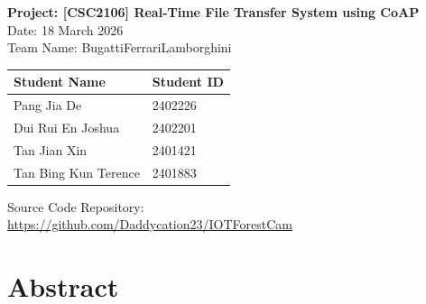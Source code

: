 \documentclass[12pt,a4paper]{article}
\begin{document}

\begin{center}
    \vspace*{1cm}
    {\Large \textbf{Project: [CSC2106] Real-Time File Transfer System using CoAP}} \\[0.5cm]
    {\large Date: 18 March 2026} \\[0.3cm]
    {\large Team Name: BugattiFerrariLamborghini} \\[1cm]

    \begin{tabular}{|p{7cm}|p{4cm}|}
        \hline
        \textbf{Student Name} & \textbf{Student ID} \\
        \hline
        Pang Jia De & 2402226 \\
        \hline
        Dui Rui En Joshua & 2402201 \\
        \hline
        Tan Jian Xin & 2401421 \\
        \hline
        Tan Bing Kun Terence & 2401883 \\
        \hline
    \end{tabular}

    \vspace{1cm}
    {\large Source Code Repository:} \\[0.3cm]
    \url{https://github.com/Daddycation23/IOTForestCam}
\end{center}

\vspace{1cm}


\section*{Abstract}
\end{document}
